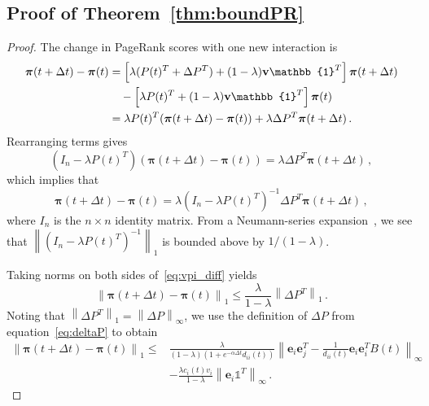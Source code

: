 \documentclass[journal,transmag]{IEEEtran}
\newcommand{\gvec}[1]{\bm{#1}}
\newcommand{\vecb}[1]{\mathbf{#1}}
\newcommand{\norm}[1]{\left\| #1 \right\|}
\newcommand{\tdt}{t+\Delta t}
\newcommand{\dP}{\Delta P}
\newcommand{\vpi}{\gvec{\pi}}
\begin{document}

\subsection{Proof of Theorem~\ref{thm:boundPR}}

\begin{proof}
The change in PageRank scores with one new interaction is
{\tiny
\begin{align}
 	   \vpi(\tdt) - \vpi(t) &= 
     \left[\lambda(P(t)^T + \dP^T) 
       + (1-\lambda)\vecb{v}\mathbb{1}^T\right]\vpi(\tdt)  \notag \\
  &\quad - \left[\lambda P(t)^T 
      + (1-\lambda)\vecb{v}\mathbb{1}^T\right]\vpi(t)  \\
    & = \lambda P(t)^T(\vpi(\tdt) - \vpi(t)) 
      + \lambda \dP^T\vpi(\tdt)\,. \notag
\end{align}}
Rearranging terms gives
\begin{equation}
  \left(I_n - \lambda P(t)^T\right)\left(\vpi(\tdt) 
  - \vpi(t)\right)  
  = \lambda \Delta {P}^T \vpi(\tdt)\,,
\end{equation}
which implies that
\begin{equation} \label{eq:vpi_diff}
  \vpi(\tdt) - \vpi(t) = 
  \lambda  \left(I_n - \lambda P(t)^T\right)^{-1}\dP^T
  \vpi(\tdt)\,,
\end{equation}
where $I_n$ is the $n \times n$ identity matrix. From a Neumann-series expansion~\cite{tyrtyshnikov_1997}, we see that $\norm{(I_n - \lambda P(t)^T)^{-1}}_1$ is bounded above by $1/(1 - \lambda)$.

Taking norms on both sides of~\eqref{eq:vpi_diff} yields
\begin{equation}
	  \norm{\vpi(\tdt) - \vpi(t)}_{1} 
  \leq \frac{\lambda}{1-\lambda}\norm{\Delta P^T}_{1}\,.
  \label{eq:prdiffbound}
\end{equation}
Noting that $\norm{\dP^T}_{1} = \norm{\dP}_\infty$, 
we use the definition of $\dP$ from equation~\eqref{eq:deltaP} to obtain
{\tiny
\begin{equation}
  \begin{split}
    \norm{\vpi(\tdt) - \vpi(t)}_{1} \leq &
    \frac{\lambda}{(1-\lambda)(1+e^{-\alpha \Delta t}d_{ii}(t))}
    \norm{ \vecb{e}_{i}\vecb{e}_{j}^T -\frac{1}{d_{ii}(t)}
      \vecb{e}_{i}\vecb{e}_{i}^TB(t)}_{\infty} \\ & - \frac{\lambda
      c_i(t)v_i}{1-\lambda}\norm{
      \vecb{e}_{i}\mathbb{1}^T}_\infty\,.
  \label{eq:prdiffinserted}
\end{split}
\end{equation}}


\end{proof}
\end{document}
